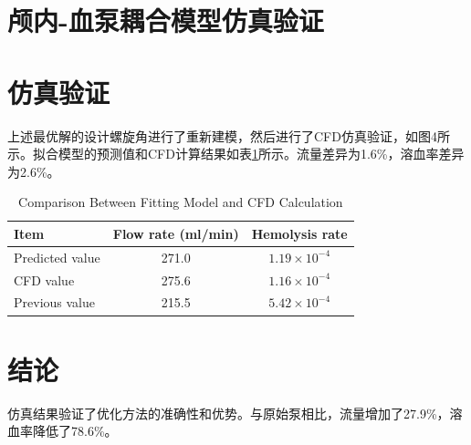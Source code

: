 \documentclass[12pt]{article}
\begin{document}
\section{颅内-血泵耦合模型仿真验证}


\section{仿真验证}
上述最优解的设计螺旋角进行了重新建模，然后进行了CFD仿真验证，如图4所示。拟合模型的预测值和CFD计算结果如表\ref{tab:comparison}所示。流量差异为1.6\%，溶血率差异为2.6\%。

\begin{table}[h]
    \centering
    \caption{Comparison Between Fitting Model and CFD Calculation}
    \label{tab:comparison}
    \begin{tabular}{lcc}
        \toprule
        Item & Flow rate (ml/min) & Hemolysis rate \\
        \midrule
        Predicted value & 271.0 & $1.19 \times 10^{-4}$ \\
        CFD value & 275.6 & $1.16 \times 10^{-4}$ \\
        Previous value & 215.5 & $5.42 \times 10^{-4}$ \\
        \bottomrule
    \end{tabular}
\end{table}

\section{结论}
仿真结果验证了优化方法的准确性和优势。与原始泵相比，流量增加了27.9\%，溶血率降低了78.6\%。
\end{document}
